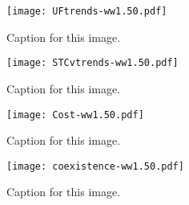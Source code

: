 
\begin{figure}[h]
\vspace*{-7mm}
\hspace*{-6mm}
	\centering
	\texttt{[image: UFtrends-ww1.50.pdf]}
	\caption{Caption for this image.}
	\label{fig:UFtrends}
\end{figure}


\pagebreak
\begin{figure}[h]
\vspace*{-7mm}
\hspace*{-6mm}
	\centering
	\texttt{[image: STCvtrends-ww1.50.pdf]}
	\caption{Caption for this image.}
	\label{fig:STCvtrends}
\end{figure}


\pagebreak
\begin{figure}[h]
\vspace*{-7mm}
\hspace*{-6mm}
	\centering
	\texttt{[image: Cost-ww1.50.pdf]}
	\caption{Caption for this image.}
	\label{fig:Cost}
\end{figure}

\begin{figure}[h]
\vspace*{-7mm}
\hspace*{-6mm}
	\centering
	\texttt{[image: coexistence-ww1.50.pdf]}
	\caption{Caption for this image.}
	\label{fig:Coexistence}
\end{figure}



